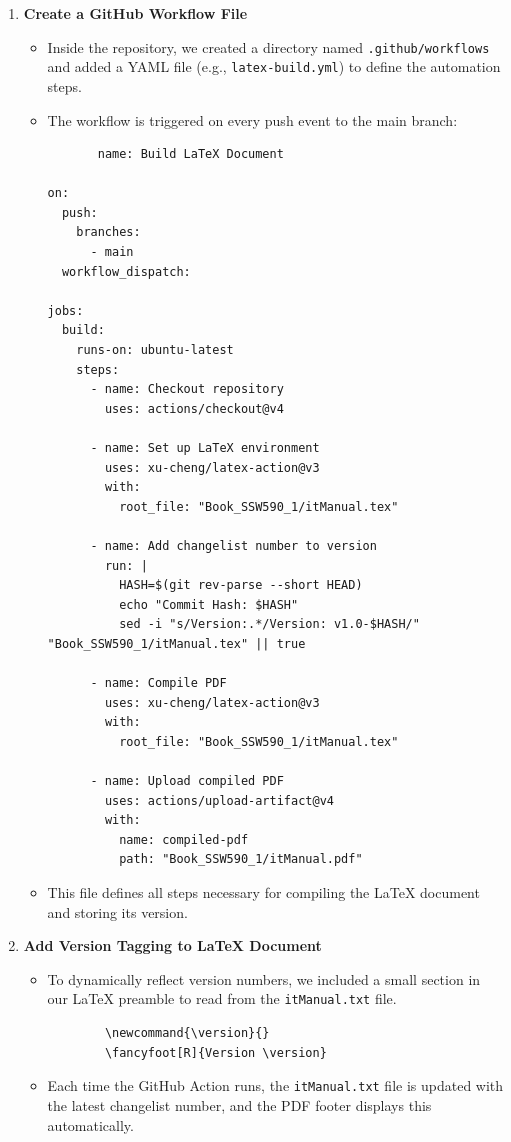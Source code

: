 \begin{enumerate}
    \item \textbf{Create a GitHub Workflow File}
    \begin{itemize}
        \item Inside the repository, we created a directory named \texttt{.github/workflows} and added a YAML file (e.g., \texttt{latex-build.yml}) to define the automation steps.
        \item The workflow is triggered on every push event to the main branch:
        \begin{verbatim}
       name: Build LaTeX Document

on:
  push:
    branches:
      - main
  workflow_dispatch:

jobs:
  build:
    runs-on: ubuntu-latest
    steps:
      - name: Checkout repository
        uses: actions/checkout@v4

      - name: Set up LaTeX environment
        uses: xu-cheng/latex-action@v3
        with:
          root_file: "Book_SSW590_1/itManual.tex"

      - name: Add changelist number to version
        run: |
          HASH=$(git rev-parse --short HEAD)
          echo "Commit Hash: $HASH"
          sed -i "s/Version:.*/Version: v1.0-$HASH/" "Book_SSW590_1/itManual.tex" || true

      - name: Compile PDF
        uses: xu-cheng/latex-action@v3
        with:
          root_file: "Book_SSW590_1/itManual.tex"

      - name: Upload compiled PDF
        uses: actions/upload-artifact@v4
        with:
          name: compiled-pdf
          path: "Book_SSW590_1/itManual.pdf"
        \end{verbatim}
        \item This file defines all steps necessary for compiling the LaTeX document and storing its version.
    \end{itemize}

    \item \textbf{Add Version Tagging to LaTeX Document}
    \begin{itemize}
        \item To dynamically reflect version numbers, we included a small section in our LaTeX preamble to read from the \texttt{itManual.txt} file.
        \begin{verbatim}
        \newcommand{\version}{}
        \fancyfoot[R]{Version \version}
        \end{verbatim}
        \item Each time the GitHub Action runs, the \texttt{itManual.txt} file is updated with the latest changelist number, and the PDF footer displays this automatically.
    \end{itemize}


\end{enumerate}
